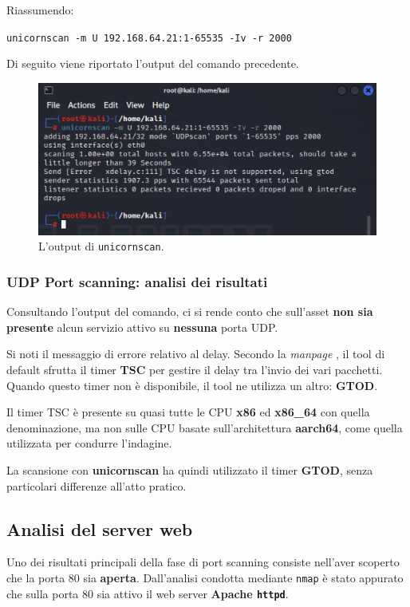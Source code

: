 \documentclass[a4paper, 12pt, oneside]{article}
\begin{document}
Riassumendo:

\begin{center}
    \texttt{unicornscan -m U 192.168.64.21:1-65535 -Iv -r 2000}
\end{center}

Di seguito viene riportato l'output del comando precedente.

\begin{figure}[h!]
    \centering
    \includegraphics[width=\textwidth]{img/unicornscan.png}
    \caption{L'output di \texttt{unicornscan}.}
\end{figure}

\subsubsection{UDP Port scanning: analisi dei risultati}
Consultando l'output del comando, ci si rende conto che sull'asset \textbf{non sia presente} alcun servizio attivo su \textbf{nessuna} porta UDP.

Si noti il messaggio di errore relativo al delay. Secondo la \textit{manpage} \cite{unicornscan-man}, il tool di default sfrutta il timer \textbf{TSC} per gestire il delay tra l'invio dei vari pacchetti. Quando questo timer non è disponibile, il tool ne utilizza un altro: \textbf{GTOD}. 

Il timer TSC è presente su quasi tutte le CPU \textbf{x86} ed \textbf{x86\_64} con quella denominazione, ma non sulle CPU basate sull'architettura \textbf{aarch64}, come quella utilizzata per condurre l'indagine. 

La scansione con \textbf{unicornscan} ha quindi utilizzato il timer \textbf{GTOD}, senza particolari differenze all'atto pratico.

\subsection{Analisi del server web}
Uno dei risultati principali della fase di port scanning consiste nell'aver scoperto che la porta 80 sia \textbf{aperta}. Dall'analisi condotta mediante \texttt{nmap} è stato appurato che sulla porta 80 sia attivo il web server \textbf{Apache \texttt{httpd}}. 
\end{document}
